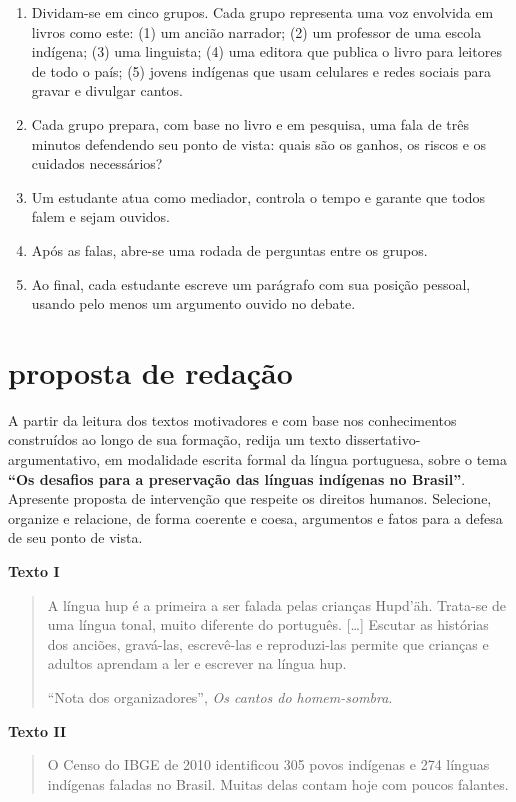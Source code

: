 \begin{enumerate}[label=\arabic*.]
\item Dividam-se em cinco grupos. Cada grupo representa uma voz
envolvida em livros como este: (1) um ancião narrador; (2) um professor
de uma escola indígena; (3) uma linguista; (4) uma editora que publica o
livro para leitores de todo o país; (5) jovens indígenas que usam
celulares e redes sociais para gravar e divulgar cantos.
\item Cada grupo prepara, com base no livro e em pesquisa, uma fala de
três minutos defendendo seu ponto de vista: quais são os ganhos, os
riscos e os cuidados necessários?
\item Um estudante atua como mediador, controla o tempo e garante que
todos falem e sejam ouvidos.
\item Após as falas, abre-se uma rodada de perguntas entre os grupos.
\item Ao final, cada estudante escreve um parágrafo com sua posição
pessoal, usando pelo menos um argumento ouvido no debate.
\end{enumerate}

\section{proposta de redação}

A partir da leitura dos textos motivadores e com base nos conhecimentos
construídos ao longo de sua formação, redija um texto
dissertativo-argumentativo, em modalidade escrita formal da língua
portuguesa, sobre o tema \textbf{``Os desafios para a preservação das
línguas indígenas no Brasil''}. Apresente proposta de intervenção que
respeite os direitos humanos. Selecione, organize e relacione, de forma
coerente e coesa, argumentos e fatos para a defesa de seu ponto de vista.

\textbf{Texto I}
\begin{quote}
A língua hup é a primeira a ser falada pelas crianças Hupd'äh. Trata-se
de uma língua tonal, muito diferente do português. [\ldots] Escutar as
histórias dos anciões, gravá-las, escrevê-las e reproduzi-las permite
que crianças e adultos aprendam a ler e escrever na língua hup.

\hfill ``Nota dos organizadores'', \textit{Os cantos do homem-sombra}.
\end{quote}

\textbf{Texto II}
\begin{quote}
O Censo do IBGE de 2010 identificou 305 povos indígenas e 274 línguas
indígenas faladas no Brasil. Muitas delas contam hoje com poucos
falantes.
\end{quote}

